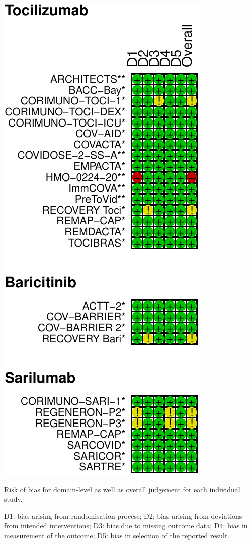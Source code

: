\documentclass[
  12pt,
]{article}
\begin{document}
\begin{center}\includegraphics{supplementary_material_files/figure-latex/unnamed-chunk-5-1} \end{center}

Risk of bias for domain-level as well as overall judgement for each
individual study.

D1: bias arising from randomisation process; D2: bias arising from
deviations from intended interventions; D3: bias due to missing outcome
data; D4: bias in measurement of the outcome; D5: bias in selection of
the reported result.
\end{document}
